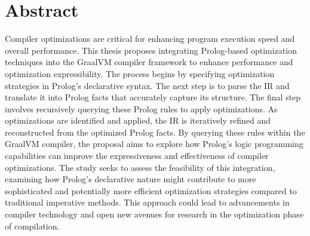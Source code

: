 \chapter[Abstract]{Abstract}

\noindent
Compiler optimizations are critical for enhancing program execution speed and overall performance.
This thesis proposes integrating Prolog-based optimization techniques into the GraalVM compiler framework to enhance performance and optimization expressibility. 
The process begins by specifying optimization strategies in Prolog’s declarative syntax. The next step is to parse the IR and translate it into Prolog facts that accurately capture its structure. The final step involves recursively querying these Prolog rules to apply optimizations. As optimizations are identified and applied, the IR is iteratively refined and reconstructed from the optimized Prolog facts. By querying these rules within the GraalVM compiler, the proposal aims to explore how Prolog’s logic programming capabilities can improve the expressiveness and effectiveness of compiler optimizations. The study seeks to assess the feasibility of this integration, examining how Prolog’s declarative nature might contribute to more sophisticated and potentially more efficient optimization strategies compared to traditional imperative methods. This approach could lead to advancements in compiler technology and open new avenues for research in the optimization phase of compilation.
